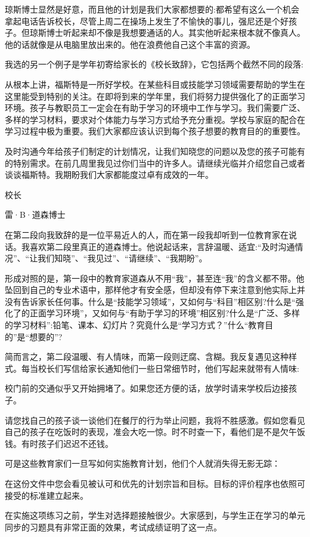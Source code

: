 琼斯博士显然是好意，而且他的计划是我们大家都想要的:都希望有这么一个机会拿起电话告诉校长，尽管上周二在操场上发生了不愉快的事儿，强尼还是个好孩子。但琼斯博士听起来却不像是我想要通话的人。其实他听起来根本就不像真人。他的话就像是从电脑里放出来的。他在浪费他自己这个丰富的资源。

我选的另一个例子是学年初寄给家长的《校长致辞》，它包括两个截然不同的段落:

从根本上讲，福斯特是一所好学校。在某些科目或技能学习领域需要帮助的学生在这里能受到特别的关注。在即将到来的学年里，我们将努力提供强化了的正面学习环境。孩子与教职员工一定会在有助于学习的环境中工作与学习。我们需要广泛、多样的学习材料，要求对个体能力与学习方式给予充分重视。学校与家庭的配合在学习过程中极为重要。我们大家都应该认识到每个孩子想要的教育目的的重要性。

及时沟通今年给孩子们制定的计划情况，让我们知晓您的问题以及您的孩子可能有的特别需求。在前几周里我见过你们当中的许多人。请继续光临并介绍您自己或者谈谈福斯特。我期盼我们大家都能度过卓有成效的一年。

校长

雷·B·道森博士

在第二段向我致辞的是一位平易近人的人，而在第一段我却听到一位教育家在说话。我喜欢第二段里真正的道森博士。他说起话来，言辞温暖、适宜:“及时沟通情况”、“让我们知晓”、“我见过”、“请继续”、“我期盼”。

形成对照的是，第一段中的教育家道森从不用“我”，甚至连“我”的含义都不带。他坠回到自己的专业术语中，那样他才有安全感，但却没有停下来注意到他实际上并没有告诉家长任何事。什么是“技能学习领域”，又如何与“科目”相区别?什么是“强化了的正面学习环境”，又如何与“有助于学习的环境”相区别?什么是“广泛、多样的学习材料”:铅笔、课本、幻灯片？究竟什么是“学习方式？”什么“教育目的”是“想要的”?

简而言之，第二段温暖、有人情味，而第一段则迂腐、含糊。我反复遇见这种样式。每当校长们写信给家长通知他们一些日常细节时，他们写起来就带有人情味:

校门前的交通似乎又开始拥堵了。如果您还方便的话，放学时请来学校后边接孩子。

请您找自己的孩子谈一谈他们在餐厅的行为举止问题，我将不胜感激。假如您看见自己的孩子在吃饭时的表现，准会大吃一惊。时不时查一下，看他们是不是欠午饭钱。有时孩子们迟迟不还钱。

可是这些教育家们一旦写如何实施教育计划，他们个人就消失得无影无踪：

在这份文件中您会看见被认可和优先的计划宗旨和目标。目标的评价程序也依照可接受的标准建立起来。

在实施这项练习之前，学生对选择题接触很少。大家感到，与学生正在学习的单元同步的习题具有非常正面的效果，考试成绩证明了这一点。

